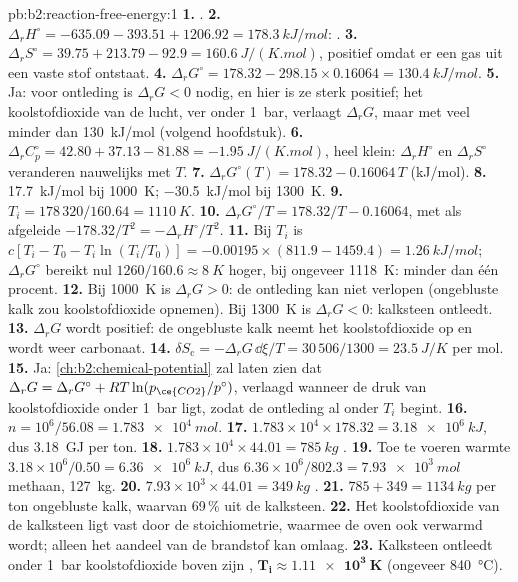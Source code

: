 \begin{solution}{pb:b2:reaction-free-energy:1}
\textbf{1.} .
\textbf{2.} $\Delta_r H^\circ = -635.09 - 393.51 + 1206.92 =
\qty{+178.3}{kJ/mol}$: .
\textbf{3.} $\Delta_r S^\circ = 39.75 + 213.79 - 92.9 = \qty{+160.6}{J/(K.mol)}$,
positief omdat er een gas uit een vaste stof ontstaat.
\textbf{4.} $\Delta_r G^\circ = 178.32 - 298.15 \times 0.16064 =
\qty{+130.4}{kJ/mol}$.
\textbf{5.} Ja: voor ontleding is $\Delta_r G < 0$ nodig, en hier is ze
sterk positief; het koolstofdioxide van de lucht, ver onder \qty{1}{bar},
verlaagt $\Delta_r G$, maar met veel minder dan \qty{130}{kJ/mol} (volgend hoofdstuk).
\textbf{6.} $\Delta_r C^\circ_p = 42.80 + 37.13 - 81.88 =
\qty{-1.95}{J/(K.mol)}$, heel klein: $\Delta_r H^\circ$ en $\Delta_r S^\circ$
veranderen nauwelijks met $T$.
\textbf{7.} $\Delta_r G^\circ(T) = 178.32 - 0.16064\,T$ (\unit{kJ/mol}).
\textbf{8.} \qty{+17.7}{kJ/mol} bij \qty{1000}{K}; \qty{-30.5}{kJ/mol} bij
\qty{1300}{K}.
\textbf{9.} $T_i = 178\,320/160.64 = \qty{1110}{K}$.
\textbf{10.} $\Delta_r G^\circ/T = 178.32/T - 0.16064$, met als afgeleide
$-178.32/T^2 = -\Delta_r H^\circ/T^2$.
\textbf{11.} Bij $T_i$ is $c[T_i - T_0 - T_i\ln(T_i/T_0)] = -0.00195 \times
(811.9 - 1459.4) = \qty{+1.26}{kJ/mol}$; $\Delta_r G^\circ$ bereikt nul
$1260/160.6 \approx \qty{8}{K}$ hoger, bij ongeveer \qty{1118}{K}: minder dan
één procent.
\textbf{12.} Bij \qty{1000}{K} is $\Delta_r G > 0$: de ontleding kan niet
verlopen (ongebluste kalk zou koolstofdioxide opnemen). Bij \qty{1300}{K} is $\Delta_r G <
0$: kalksteen ontleedt.
\textbf{13.} $\Delta_r G$ wordt positief: de ongebluste kalk neemt het koolstofdioxide op
en wordt weer carbonaat.
\textbf{14.} $\delta S_{\text{c}} = -\Delta_r G\,\dd\xi/T = 30\,506/1300 =
\qty{23.5}{J/K}$ per mol.
\textbf{15.} Ja: \cref{ch:b2:chemical-potential} zal laten zien dat
$\Delta_r G = \Delta_r G^\circ + RT\ln(p_{\ce{CO2}}/p^\circ)$, verlaagd
wanneer de druk van koolstofdioxide onder \qty{1}{bar} ligt, zodat de
ontleding al onder $T_i$ begint.
\textbf{16.} $n = 10^6/56.08 = \qty{1.783e4}{mol}$.
\textbf{17.} $1.783 \times 10^4 \times 178.32 = \qty{3.18e6}{kJ}$, dus
\qty{3.18}{GJ} per ton.
\textbf{18.} $1.783 \times 10^4 \times 44.01 = \qty{785}{kg}$ .
\textbf{19.} Toe te voeren warmte $3.18 \times 10^6/0.50 = \qty{6.36e6}{kJ}$, dus
$6.36 \times 10^6/802.3 = \qty{7.93e3}{mol}$ methaan, \qty{127}{kg}.
\textbf{20.} $7.93 \times 10^3 \times 44.01 = \qty{349}{kg}$ .
\textbf{21.} $785 + 349 = \qty{1134}{kg}$ per ton ongebluste kalk, waarvan 69\,\%
uit de kalksteen.
\textbf{22.} Het koolstofdioxide van de kalksteen ligt vast door de stoichiometrie,
waarmee de oven ook verwarmd wordt; alleen het aandeel van de brandstof kan omlaag.
\textbf{23.} Kalksteen ontleedt onder \qty{1}{bar} koolstofdioxide boven
zijn , $\boldsymbol{T_i \approx \qty{1.11e3}{K}}$
(ongeveer \qty{840}{\celsius}).
\end{solution}
